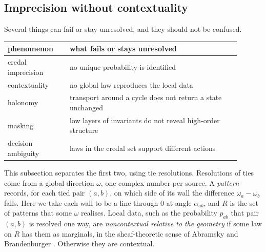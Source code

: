 \documentclass[11pt]{article}
\theoremstyle{definition}\newtheorem{definition}[theorem]{Definition}\newtheorem{remark}[theorem]{Remark}\newtheorem{example}[theorem]{Example}\newtheorem{problem}[theorem]{Open problem}\crefname{problem}{Problem}{Problems}
\begin{document}
\subsection{Imprecision without contextuality}\label{sec:imprecctx}
Several things can fail or stay unresolved, and they should not be confused.
\begin{center}
\begin{tabular}{p{0.24\linewidth}p{0.66\linewidth}}
phenomenon & what fails or stays unresolved \\ \hline
credal imprecision & no unique probability is identified \\
contextuality & no global law reproduces the local data \\
holonomy & transport around a cycle does not return a state unchanged \\
masking & low layers of invariants do not reveal high-order structure \\
decision ambiguity & laws in the credal set support different actions \\
\end{tabular}
\end{center}
This subsection separates the first two, using tie resolutions. Resolutions of ties come from a global direction $\omega$, one complex number per source. A \emph{pattern} records, for each tied pair $(a,b)$, on which side of its wall the difference $\omega_a-\omega_b$ falls. Here we take each wall to be a line through $0$ at angle $\alpha_{ab}$, and $R$ is the set of patterns that some $\omega$ realises. Local data, such as the probability $p_{ab}$ that pair $(a,b)$ is resolved one way, are \emph{noncontextual relative to the geometry} if some law on $R$ has them as marginals, in the sheaf-theoretic sense of Abramsky and Brandenburger \cite{AbramskyBrandenburger2011}. Otherwise they are contextual.
\end{document}
